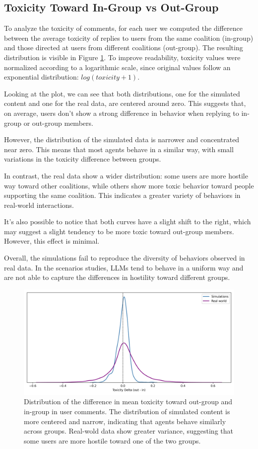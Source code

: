 \subsection{Toxicity Toward In-Group vs Out-Group}
To analyze the toxicity of comments, for each user we computed the difference between the average toxicity of replies to users from the same coalition (in-group) and those directed at users from different coalitions (out-group).
The resulting distribution is visible in Figure \ref{fig:toxicity_in_out}.
To improve readability, toxicity values were normalized according to a logarithmic scale, since original values follow an exponential distribution: $log(toxicity + 1)$.

Looking at the plot, we can see that both distributions, one for the simulated content and one for the real data, are centered around zero.
This suggests that, on average, users don't show a strong difference in behavior when replying to in-group or out-group members.

However, the distribution of the simulated data is narrower and concentrated near zero.
This means that most agents behave in a similar way, with small variations in the toxicity difference between groups.

In contrast, the real data show a wider distribution: some users are more hostile way toward other coalitions, while others show more toxic behavior toward people supporting the same coalition.
This indicates a greater variety of behaviors in real-world interactions.

It's also possible to notice that both curves have a slight shift to the right, which may suggest a slight tendency to be more toxic toward out-group members. However, this effect is minimal.

Overall, the simulations fail to reproduce the diversity of behaviors observed in real data. 
In the scenarios studies, LLMs tend to behave in a uniform way and are not able to capture the differences in hostility toward different groups.


\begin{figure}[h]
    \centering
    \includegraphics[width=0.6\linewidth]{Images/Toxicity/diff_in_out_combined.png}
    \caption{
    Distribution of the difference in mean toxicity toward out-group and in-group in user comments.
    The distribution of simulated content is more centered and narrow, indicating that agents behave similarly across groups.
    Real-wold data show greater variance, suggesting that some users are more hostile toward one of the two groups.
    }
    \label{fig:toxicity_in_out}
\end{figure}


